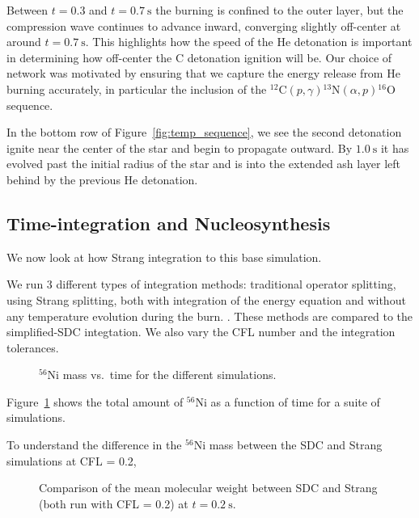\documentclass[modern]{aastex631}
\newcommand{\isot}[2]{$^{#2}\mathrm{#1}$}
\newcommand{\isotm}[2]{{}^{#2}\mathrm{#1}}
\newcommand{\MarginPar}[1]{
    \marginpar{\vskip-\baselineskip%
               \raggedright%
               \tiny\sffamily%
               {\color{red}\hrule%
               \smallskip%
               #1\par%
               \smallskip%
               \hrule}}%
}
\begin{document}
\begin{figure*}[t]
\centering
{}
\caption{\label{fig:lap_rho_sequence} Time-sequence of the SDC run showing the compression.}
\end{figure*}

Between $t = 0.3$ and $t = 0.7~\mathrm{s}$ the burning is confined to
the outer layer, but the compression wave continues to advance inward,
converging slightly off-center at around $t = 0.7~\mathrm{s}$.  This
highlights how the speed of the He detonation is important in
determining how off-center the C detonation ignition will be.  Our
choice of network was motivated by ensuring that we capture the energy
release from He burning accurately, in particular the inclusion of the
$\isotm{C}{12}(p,\gamma)\isotm{N}{13}(\alpha,p)\isotm{O}{16}$
sequence.

In the bottom row of Figure~\ref{fig:temp_sequence}, we see
the second detonation ignite near the center of the star and
begin to propagate outward.  By $1.0~\mathrm{s}$ it has evolved
past the initial radius of the star and is into the extended
ash layer left behind by the previous He detonation.

\subsection{Time-integration and Nucleosynthesis}

We now look at how Strang integration to this base simulation.

We run 3 different types of integration methods: traditional operator
splitting, using Strang splitting, both with integration of the energy
equation and without any temperature evolution during the
burn.  \MarginPar{comment about the EOS}.  These methods are compared
to the simplified-SDC integtation.  We also vary the CFL number and
the integration tolerances.

\begin{figure}[t]
\centering
{}
\caption{\label{fig:ni56} \isot{Ni}{56} mass vs.\ time for the different simulations.}
\end{figure}

Figure~\ref{fig:ni56} shows the total amount of \isot{Ni}{56} as a function of time for
a suite of simulations.  

To understand the difference in the \isot{Ni}{56} mass between the SDC and Strang simulations at 
CFL = 0.2, 

\begin{figure}[t]
\centering
{}
\caption{\label{fig:abar_sdc_strang} Comparison of the mean molecular weight between SDC and Strang (both run with CFL = 0.2) at $t = 0.2~\mathrm{s}$.}
\end{figure}
\end{document}
